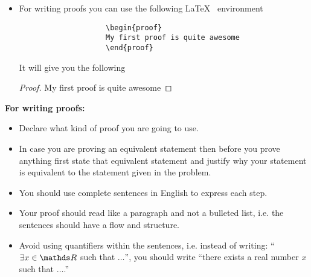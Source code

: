 \documentclass[11pt]{article}
\begin{document}
\begin{itemize}
\begin{itemize}
            \item For writing proofs you can use the following \LaTeX~ environment
               {\blue
                \begin{verbatim}
                    \begin{proof}
                    My first proof is quite awesome
                    \end{proof}
                    \end{verbatim}
                    }
                It will give you the following
                \begin{proof}
                My first proof is quite awesome
                \end{proof}
        \end{itemize}
        \end{itemize}
\newpage
\begin{center}
\textbf{\blue For writing proofs:}
\end{center}
\begin{itemize}
    \item Declare what kind of proof you are going to use.
    \item In case you are proving an equivalent statement then before you prove anything first state that equivalent statement and justify why your statement is equivalent to the statement given in the problem.
    \item You should use complete sentences in English to express each step.
    \item Your proof should read like a paragraph and not a bulleted list, i.e. the sentences should have a flow and structure.
    \item Avoid using quantifiers within the sentences, i.e. instead of writing: ``$\exists x \in \bbR$ such that $\ldots$'', you should write ``there exists a real number $x$ such that $\ldots$.''
\end{itemize}
\newpage

\maketitle

\end{document}

